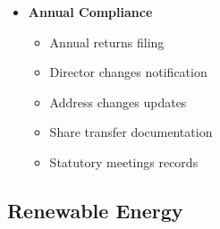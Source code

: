 \begin{tcolorbox}[
    colback=white,
    colframe=primarydark,
    title=\textbf{Corporate Affairs Commission (CAC) Requirements},
    before skip=1em,
    after skip=1em
]
\begin{itemize}[leftmargin=*,itemsep=0.5em]
        \item \textbf{Annual Compliance}
        \begin{itemize}[itemsep=0.3em]
            \item Annual returns filing
            \item Director changes notification
            \item Address changes updates
            \item Share transfer documentation
            \item Statutory meetings records
        \end{itemize}
    \end{itemize}
\end{tcolorbox}

\subsection{Renewable Energy}\label{subsec:renewable-energy}
\vspace{1em}

